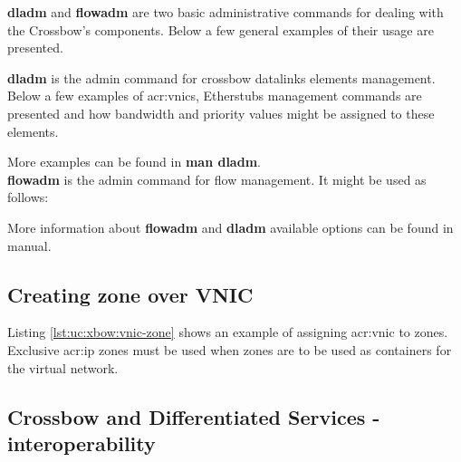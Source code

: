 \documentclass[11pt,openany]{book}
\begin{document}
        \textbf{dladm} and \textbf{flowadm} are two basic administrative commands for dealing with the Crossbow's
        components. Below a few general examples of their usage are presented.
  
        \textbf{dladm} is the admin command for crossbow datalinks elements management. Below a few examples of
        \gls{acr:vnic}s, Etherstubs management commands are presented and how bandwidth and priority values might be
        assigned to these elements. \\


        \noindent
        \begin{minipage}{\textwidth}
          
        \end{minipage}
  
        More examples can be found in \textbf{man dladm}. \\


        \textbf{flowadm} is the admin command for flow management. It might be used as follows: \\

        \noindent
        \begin{minipage}{\textwidth}
          
        \end{minipage}

        More information about \textbf{flowadm} and \textbf{dladm} available options can be found in manual.

      \subsection{Creating zone over VNIC}

        Listing \ref{lst:uc:xbow:vnic-zone} shows an example of assigning \gls{acr:vnic} to zones. Exclusive
        \gls{acr:ip} zones must be used when zones are to be used as containers for the virtual network. \\

        \noindent
        \begin{minipage}{\textwidth}
          
        \end{minipage}


      \subsection{Crossbow and Differentiated Services - interoperability}
      \label{sub:sol:diffserv}
\end{document}
